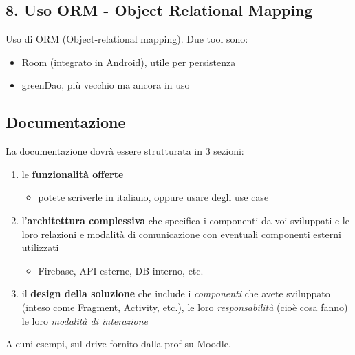 \subsection{8. Uso ORM - Object Relational Mapping}
\par Uso di ORM (Object-relational mapping). Due tool sono:
\begin{itemize}
    \item Room (integrato in Android), utile per persistenza
    \item greenDao, più vecchio ma ancora in uso
\end{itemize}

\subsection{Documentazione}
\par La documentazione dovrà essere strutturata in 3 sezioni:
\begin{enumerate}
    \item le \textbf{funzionalità offerte}
    \begin{itemize}
        \item potete scriverle in italiano, oppure usare degli use case
    \end{itemize}
    \item l'\textbf{architettura complessiva} che specifica i componenti da voi sviluppati e le loro relazioni e modalità di comunicazione con eventuali componenti esterni utilizzati
    \begin{itemize}
        \item Firebase, API esterne, DB interno, etc.
    \end{itemize}
    \item il \textbf{design della soluzione} che include i \textit{componenti} che avete sviluppato (inteso come Fragment, Activity, etc.), le loro \textit{responsabilità} (cioè cosa fanno) le loro \textit{modalità di interazione}
\end{enumerate}
\par Alcuni esempi, sul drive fornito dalla prof su Moodle.


